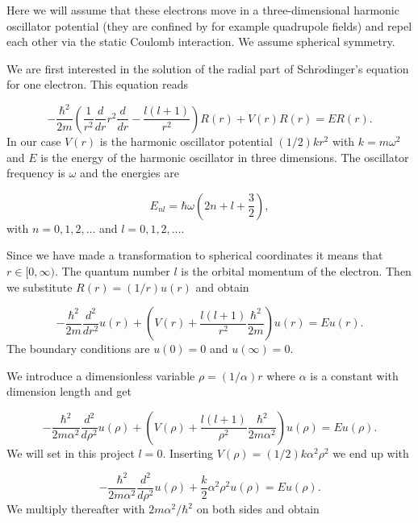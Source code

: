 \documentclass{article}
\begin{document}
Here we will assume that these electrons move in a three-dimensional harmonic
oscillator potential (they are confined by for example quadrupole fields)
and repel  each other via the static Coulomb interaction.  
We assume spherical symmetry.  

We are first interested in the solution of the radial part of Schr$\ddot{o}$dinger's equation for one electron. This equation reads

\begin{equation*}
  -\frac{\hbar^2}{2 m} \left ( \frac{1}{r^2} \frac{d}{dr} r^2
  \frac{d}{dr} - \frac{l (l + 1)}{r^2} \right )R(r) 
     + V(r) R(r) = E R(r).
\end{equation*}
In our case $V(r)$ is the harmonic oscillator potential $(1/2)kr^2$ with
$k=m\omega^2$ and $E$ is
the energy of the harmonic oscillator in three dimensions.
The oscillator frequency is $\omega$ and the energies are

\begin{equation*}
E_{nl}=  \hbar \omega \left(2n+l+\frac{3}{2}\right),
\end{equation*}
with $n=0,1,2,\dots$ and $l=0,1,2,\dots$.

Since we have made a transformation to spherical coordinates it means that 
$r\in [0,\infty)$.  
The quantum number $l$ is the orbital momentum of the electron.  
% 
Then we substitute $R(r) = (1/r) u(r)$ and obtain
% 

\begin{equation*}
  -\frac{\hbar^2}{2 m} \frac{d^2}{dr^2} u(r) 
       + \left ( V(r) + \frac{l (l + 1)}{r^2}\frac{\hbar^2}{2 m}
                                    \right ) u(r)  = E u(r) .
\end{equation*}
% 
The boundary conditions are $u(0)=0$ and $u(\infty)=0$.

We introduce a dimensionless variable $\rho = (1/\alpha) r$
where $\alpha$ is a constant with dimension length and get
% 

\begin{equation*}
  -\frac{\hbar^2}{2 m \alpha^2} \frac{d^2}{d\rho^2} u(\rho) 
       + \left ( V(\rho) + \frac{l (l + 1)}{\rho^2}
         \frac{\hbar^2}{2 m\alpha^2} \right ) u(\rho)  = E u(\rho) .
\end{equation*}
% 
We will set in this project $l=0$. Inserting $V(\rho) = (1/2) k \alpha^2\rho^2$ we end up with

\begin{equation*}
  -\frac{\hbar^2}{2 m \alpha^2} \frac{d^2}{d\rho^2} u(\rho) 
       + \frac{k}{2} \alpha^2\rho^2u(\rho)  = E u(\rho) .
\end{equation*}
We multiply thereafter with $2m\alpha^2/\hbar^2$ on both sides and obtain
\end{document}

